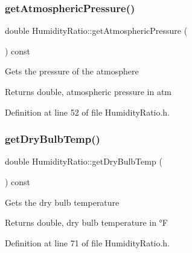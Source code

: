 \subsubsection{\texorpdfstring{get\+Atmospheric\+Pressure()}{getAtmosphericPressure()}\hspace{0.1cm}{\footnotesize\ttfamily [3/3]}}
{\footnotesize\ttfamily double Humidity\+Ratio\+::get\+Atmospheric\+Pressure (\begin{DoxyParamCaption}{ }\end{DoxyParamCaption}) const\hspace{0.3cm}{\ttfamily [inline]}}

Gets the pressure of the atmosphere

\begin{DoxyReturn}{Returns}
double, atmospheric pressure in atm 
\end{DoxyReturn}


Definition at line 52 of file Humidity\+Ratio.\+h.

\mbox{\label{class_humidity_ratio_a737b2faf32e5271b8062b175e1d018a9}} 
\subsubsection{\texorpdfstring{get\+Dry\+Bulb\+Temp()}{getDryBulbTemp()}\hspace{0.1cm}{\footnotesize\ttfamily [1/3]}}
{\footnotesize\ttfamily double Humidity\+Ratio\+::get\+Dry\+Bulb\+Temp (\begin{DoxyParamCaption}{ }\end{DoxyParamCaption}) const\hspace{0.3cm}{\ttfamily [inline]}}

Gets the dry bulb temperature

\begin{DoxyReturn}{Returns}
double, dry bulb temperature in °F 
\end{DoxyReturn}


Definition at line 71 of file Humidity\+Ratio.\+h.

\mbox{\label{class_humidity_ratio_a737b2faf32e5271b8062b175e1d018a9}} 
